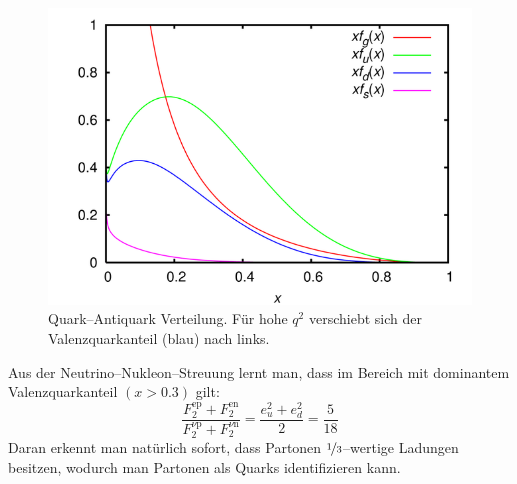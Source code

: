 \documentclass[Ex4_Zusammenfassung.tex]{subfiles}
\begin{document}
\begin{figure}[h]
	\centering
	\includegraphics[scale=0.3]{640px-CTEQ6_parton_distribution_functions.png}
	\caption{Quark--Antiquark Verteilung. Für hohe $q^2$ verschiebt sich der Valenzquarkanteil (blau) nach links.}
\end{figure}
Aus der Neutrino--Nukleon--Streuung lernt man, dass im Bereich mit dominantem Valenzquarkanteil $(x>0.3)$ gilt:
\begin{equation}
	\frac{F_2^{\text{ep}} + F_2^{\text{en}}}{F_2^{\nu\text{p}} + F_2^{\nu\text{n}}} = \frac{e_u^2+e_d^2}{2} = \frac{5}{18}
\end{equation}
Daran erkennt man natürlich sofort, dass Partonen $\nicefrac{1}{3}$--wertige Ladungen besitzen, wodurch man Partonen als Quarks identifizieren kann. 
\end{document}
